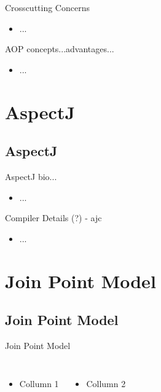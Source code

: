 \documentclass[11pt]{beamer}
\begin{document}
\begin{frame}{Crosscutting Concerns}
\begin{itemize}
\item ...
\end{itemize}
\end{frame}

\begin{frame}{AOP concepts...advantages...}
\begin{itemize}
\item ...
\end{itemize}
\end{frame}


\section{AspectJ}
\subsection*{AspectJ}

\begin{frame}{AspectJ bio...}
\begin{itemize}
\item ...
\end{itemize}
\end{frame}

\begin{frame}{Compiler Details (?) - ajc}
\begin{itemize}
\item ...
\end{itemize}
\end{frame}

\section{Join Point Model}
\subsection*{Join Point Model}

\begin{frame}{Join Point Model}
\begin{columns}
\begin{itemize}
\item Collumn 1
\end{itemize}

\begin{itemize}
\item Collumn 2
\end{itemize}
\end{columns}
\end{frame}
\end{document}
